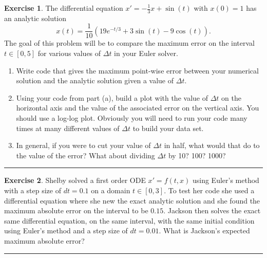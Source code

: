 \documentclass[
]{book}
\theoremstyle{definition}
\theoremstyle{definition}
\theoremstyle{definition}
\newtheorem{exercise}{Exercise}[chapter]
\theoremstyle{remark}
\begin{document}
\begin{exercise}
\protect\hypertarget{exr:ode-error-analysis}{}{\label{exr:ode-error-analysis} }The differential equation
\(x' = -\frac{1}{3}x + \sin(t)\) with \(x(0) = 1\) has an analytic solution
\[x(t) = \frac{1}{10} \left( 19 e^{-t/3} + 3\sin(t) - 9\cos(t) \right).\]
The goal of this problem will be to compare the maximum error on the
interval \(t \in  [0,5]\) for various values of \(\Delta t\) in your Euler solver.

\begin{enumerate}
\def\labelenumi{\alph{enumi}.}
\item
  Write code that gives the maximum point-wise error between your
  numerical solution and the analytic solution given a value of
  \(\Delta t\).
\item
  Using your code from part (a), build a plot with the value of
  \(\Delta t\) on the horizontal axis and the value of the
  associated error on the vertical axis. You should use a log-log
  plot. Obviously you will need to run your code many times at many
  different values of \(\Delta t\) to build your data set.
\item
  In general, if you were to cut your value of \(\Delta t\) in half,
  what would that do to the value of the error? What about dividing
  \(\Delta t\) by 10? 100? 1000?
\end{enumerate}
\end{exercise}

\begin{center}\rule{0.5\linewidth}{0.5pt}\end{center}

\begin{exercise}
\protect\hypertarget{exr:unnamed-chunk-429}{}{\label{exr:unnamed-chunk-429} }Shelby solved a first order ODE \(x' = f(t,x)\) using Euler's method with a step size of \(dt = 0.1\) on a domain \(t \in [0,3]\). To test her code she used a differential equation where she new the exact analytic solution and she found the maximum absolute error on the interval to be \(0.15\). Jackson then solves the exact same differential equation, on the same interval, with the same initial condition using Euler's method and a step size of \(dt = 0.01\). What is Jackson's expected maximum absolute error?
\end{exercise}

\begin{center}\rule{0.5\linewidth}{0.5pt}\end{center}
\end{document}
